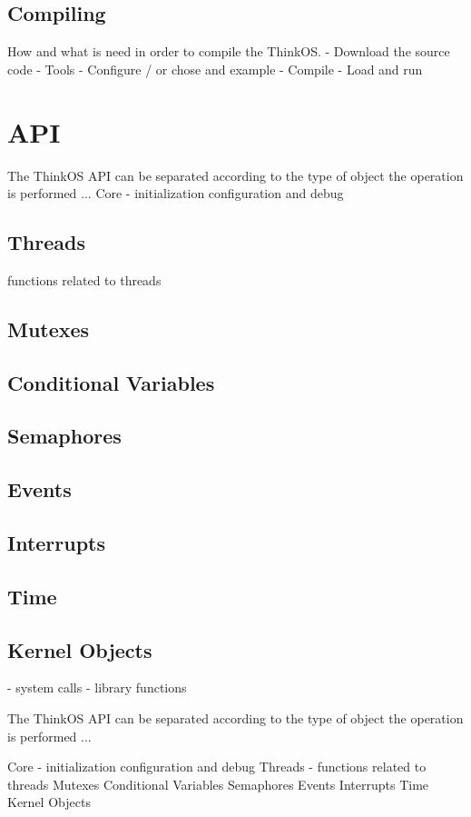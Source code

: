 \subsection{Compiling }
 How and what is need in order to compile the ThinkOS.
 - Download the source code
 - Tools
 - Configure / or chose and example
 - Compile
 - Load and run

\section{API}

The ThinkOS API can be separated according to the type of object the operation is performed ...
Core - initialization configuration and debug
\subsection{Threads}
functions related to threads
\subsection{Mutexes}
\subsection{Conditional Variables}
\subsection{Semaphores}
\subsection{Events}
\subsection{Interrupts}
\subsection{Time}
\subsection{Kernel Objects}

 - system calls
 - library functions

The ThinkOS API can be separated according to the type of object the operation is performed ...

Core - initialization configuration and debug Threads - functions related to threads Mutexes Conditional Variables Semaphores Events Interrupts Time Kernel Objects

